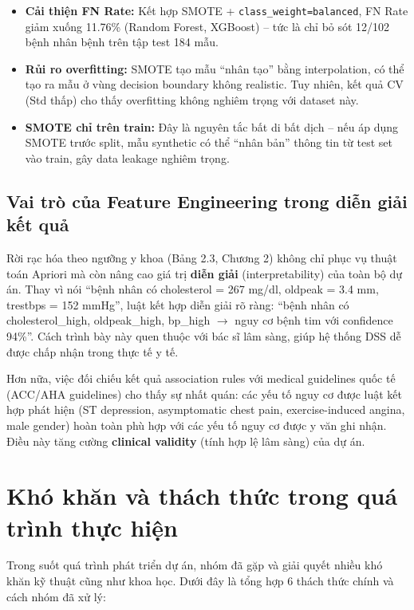 \begin{itemize}
    \item \textbf{Cải thiện FN Rate:} Kết hợp SMOTE + \texttt{class\_weight=balanced}, FN Rate giảm xuống 11.76\% (Random Forest, XGBoost) -- tức là chỉ bỏ sót 12/102 bệnh nhân bệnh trên tập test 184 mẫu.
    \item \textbf{Rủi ro overfitting:} SMOTE tạo mẫu ``nhân tạo'' bằng interpolation, có thể tạo ra mẫu ở vùng decision boundary không realistic. Tuy nhiên, kết quả CV (Std thấp) cho thấy overfitting không nghiêm trọng với dataset này.
    \item \textbf{SMOTE chỉ trên train:} Đây là nguyên tắc bất di bất dịch -- nếu áp dụng SMOTE trước split, mẫu synthetic có thể ``nhân bản'' thông tin từ test set vào train, gây data leakage nghiêm trọng.
\end{itemize}

\subsection{Vai trò của Feature Engineering trong diễn giải kết quả}

Rời rạc hóa theo ngưỡng y khoa (Bảng 2.3, Chương 2) không chỉ phục vụ thuật toán Apriori mà còn nâng cao giá trị \textbf{diễn giải} (interpretability) của toàn bộ dự án. Thay vì nói ``bệnh nhân có cholesterol = 267 mg/dl, oldpeak = 3.4 mm, trestbps = 152 mmHg'', luật kết hợp diễn giải rõ ràng: ``bệnh nhân có cholesterol\_high, oldpeak\_high, bp\_high $\rightarrow$ nguy cơ bệnh tim với confidence 94\%''. Cách trình bày này quen thuộc với bác sĩ lâm sàng, giúp hệ thống DSS dễ được chấp nhận trong thực tế y tế.

Hơn nữa, việc đối chiếu kết quả association rules với medical guidelines quốc tế (ACC/AHA guidelines) cho thấy sự nhất quán: các yếu tố nguy cơ được luật kết hợp phát hiện (ST depression, asymptomatic chest pain, exercise-induced angina, male gender) hoàn toàn phù hợp với các yếu tố nguy cơ được y văn ghi nhận. Điều này tăng cường \textbf{clinical validity} (tính hợp lệ lâm sàng) của dự án.

\section{Khó khăn và thách thức trong quá trình thực hiện}

Trong suốt quá trình phát triển dự án, nhóm đã gặp và giải quyết nhiều khó khăn kỹ thuật cũng như khoa học. Dưới đây là tổng hợp 6 thách thức chính và cách nhóm đã xử lý:

